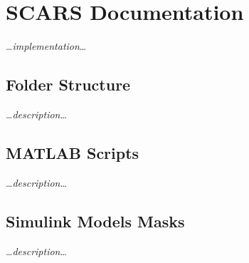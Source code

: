 \section{SCARS Documentation}\label{sec:documentation}
    \dots\textit{implementation}\dots
    
    \subsection{Folder Structure}
        \dots\textit{description}\dots
    
    \subsection{MATLAB Scripts}
        \dots\textit{description}\dots

    \subsection{Simulink Models Masks}
        \dots\textit{description}\dots
